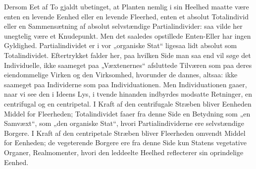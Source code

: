 \documentclass[12pt,a4paper]{book}
\begin{document}
Dersom Eet af To gjaldt ubetinget, at Planten nemlig i sin Heelhed maatte være
enten en levende Eenhed eller en levende Fleerhed, enten et absolut Totalindivid
eller en Sammensætning af absolut selvstændige Partialindivider: saa vilde her
unegtelig være et Knudepunkt. Men det saaledes opstillede Enten-Eller har ingen
Gyldighed. Partialindividet er i vor „organiske Stat“ ligesaa lidt absolut som
Totalindividet. Eftertrykket falder her, paa hvilken Side man saa
end vil søge det Individuelle, ikke saameget paa „Væxtenernes“ afsluttede
Tilværen som paa deres eiendommelige Virken og den Virksomhed, hvorunder de
dannes, altsaa: ikke saameget paa Individerne som paa Individuationen. Men
Individuationen gaaer, naar vi see den i Ideens Lys, i tvende hinanden indbyrdes
modsatte Retninger, en centrifugal og en centripetal. I Kraft af den
centrifugale Stræben bliver Eenheden Middel for Fleerheden; Totalindividet faaer
fra denne Side en Betydning som „en Samvæxt“, som „den organiske Stat“, hvori
Partialindividerne ere selvstændige Borgere. I Kraft af den centripetale Stræben
bliver Fleerheden omvendt Middel for Eenheden; de vegeterende Borgere ere fra
denne Side kun Statens vegetative Organer, Realmomenter, hvori den leddeelte
Heelhed reflecterer sin oprindelige Eenhed.
\end{document}

